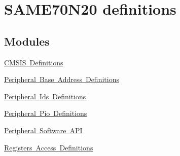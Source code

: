 \hypertarget{group__SAME70N20__definitions}{}\section{S\+A\+M\+E70\+N20 definitions}
\label{group__SAME70N20__definitions}
\subsection*{Modules}
\begin{DoxyCompactItemize}
\item 
\mbox{\hyperlink{group__SAME70N20__cmsis}{C\+M\+S\+I\+S Definitions}}
\item 
\mbox{\hyperlink{group__SAME70N20__base}{Peripheral Base Address Definitions}}
\item 
\mbox{\hyperlink{group__SAME70N20__id}{Peripheral Ids Definitions}}
\item 
\mbox{\hyperlink{group__SAME70N20__pio}{Peripheral Pio Definitions}}
\item 
\mbox{\hyperlink{group__SAME70N20__api}{Peripheral Software A\+PI}}
\item 
\mbox{\hyperlink{group__SAME70N20__reg}{Registers Access Definitions}}
\end{DoxyCompactItemize}
